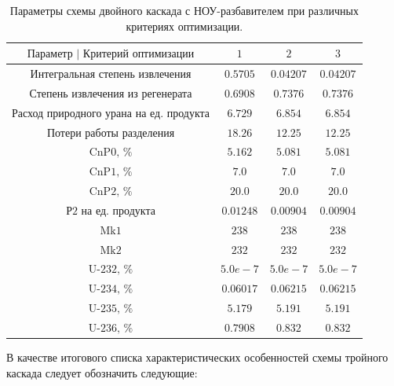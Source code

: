 \begin{table}
    \begin{tabular}{cccc}
        $\text{Параметр | Критерий оптимизации}$ & $\text{1}$ & $\text{2}$ & $\text{3}$\\ \hline
        $\text{Интегральная степень извлечения}$ & $0.5705$ & $0.04207$ & $0.04207$\\ \hline
        $\text{Степень извлечения из регенерата}$ & $0.6908$ & $0.7376$ & $0.7376$\\ \hline
        $\text{Расход природного урана на ед. продукта}$ & $6.729$ & $6.854$ & $6.854$\\ \hline
        $\text{Потери работы разделения}$ & $18.26$ & $12.25$ & $12.25$\\ \hline
        $\text{CnP0, \%}$ & $5.162$ & $5.081$ & $5.081$\\ \hline
        $\text{CnP1, \%}$ & $7.0$ & $7.0$ & $7.0$\\ \hline
        $\text{CnP2, \%}$ & $20.0$ & $20.0$ & $20.0$\\ \hline
        $\text{Р2 на ед. продукта}$ & $0.01248$ & $0.00904$ & $0.00904$\\ \hline
        $\text{Mk1}$ & $238$ & $238$ & $238$\\ \hline
        $\text{Mk2}$ & $232$ & $232$ & $232$\\ \hline
        $\text{U-232, \%}$ & $5.0e-7$ & $5.0e-7$ & $5.0e-7$\\ \hline
        $\text{U-234, \%}$ & $0.06017$ & $0.06215$ & $0.06215$\\ \hline
        $\text{U-235, \%}$ & $5.179$ & $5.191$ & $5.191$\\ \hline
        $\text{U-236, \%}$ & $0.7908$ & $0.832$ & $0.832$
        \end{tabular}
\caption{Параметры схемы двойного каскада с НОУ-разбавителем при различных критериях оптимизации.{\label{5opt5_20}}}
\end{table}

В качестве итогового списка характеристических особенностей схемы тройного каскада следует обозначить следующие:

